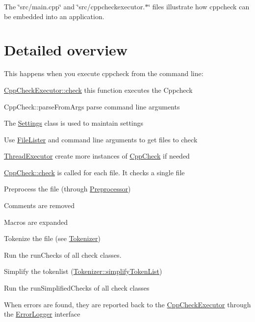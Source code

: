 The \char`\"{}src/main.\-cpp\char`\"{} and \char`\"{}src/cppcheckexecutor.$\ast$\char`\"{} files illustrate how cppcheck can be embedded into an application.\hypertarget{index_detailed_overview_sec}{}\section{Detailed overview}\label{index_detailed_overview_sec}
This happens when you execute cppcheck from the command line\-:
\begin{DoxyEnumerate}
\item \hyperlink{class_cpp_check_executor_a9006ccb8322dc7c2f87591788e31f4fe}{Cpp\-Check\-Executor\-::check} this function executes the Cppcheck
\item Cpp\-Check\-::parse\-From\-Args parse command line arguments
\begin{DoxyItemize}
\item The \hyperlink{class_settings}{Settings} class is used to maintain settings
\item Use \hyperlink{class_file_lister}{File\-Lister} and command line arguments to get files to check
\end{DoxyItemize}
\item \hyperlink{class_thread_executor}{Thread\-Executor} create more instances of \hyperlink{class_cpp_check}{Cpp\-Check} if needed
\item \hyperlink{class_cpp_check_abc81dee40c7f0c5f5ef353c2e4e46729}{Cpp\-Check\-::check} is called for each file. It checks a single file
\item Preprocess the file (through \hyperlink{class_preprocessor}{Preprocessor})
\begin{DoxyItemize}
\item Comments are removed
\item Macros are expanded
\end{DoxyItemize}
\item Tokenize the file (see \hyperlink{class_tokenizer}{Tokenizer})
\item Run the run\-Checks of all check classes.
\item Simplify the tokenlist (\hyperlink{class_tokenizer_a831fde8399875de9890ee2dc03e6b5fb}{Tokenizer\-::simplify\-Token\-List})
\item Run the run\-Simplified\-Checks of all check classes
\end{DoxyEnumerate}

When errors are found, they are reported back to the \hyperlink{class_cpp_check_executor}{Cpp\-Check\-Executor} through the \hyperlink{class_error_logger}{Error\-Logger} interface 